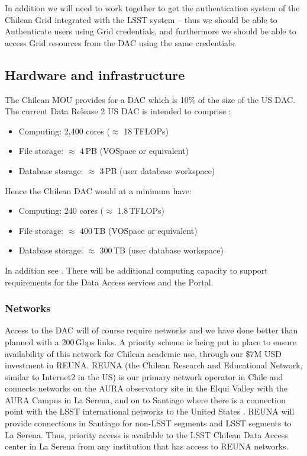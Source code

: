 In addition we will need to work together to get the authentication system of the Chilean Grid integrated with the LSST system  -- thus we should be able to Authenticate users using Grid credentials, and furthermore we should be able to access Grid resources from the DAC using the same credentials.


\subsection{Hardware and infrastructure}\label{sec:hw}

The Chilean MOU provides for a DAC which is 10\% of the size of the US DAC.
The current Data Release 2 US DAC is intended to comprise :
\begin{itemize}
\item Computing: 2,400 cores ($\approx$ 18\,TFLOPs)
\item File storage: $\approx$ 4\,PB  (VOSpace or equivalent)
\item Database storage: $\approx$ 3\,PB (user database workspace)

\end{itemize}

Hence the Chilean DAC would at a minimum have:
\begin{itemize}
\item Computing: 240 cores ($\approx$ 1.8\,TFLOPs)
\item File storage: $\approx$ 400\,TB  (VOSpace or equivalent)
\item Database storage: $\approx$ 300\,TB (user database workspace)

\end{itemize}

In addition see .
There will be additional computing capacity to support requirements for the Data Access services and the Portal.


\subsubsection{Networks}

Access to the DAC will of course require networks and we have done better than planned with a 200\,Gbps links.
A priority scheme is being put in place to ensure availability of this network  for Chilean academic use, through our \$7M USD investment in REUNA.
REUNA (the Chilean Research and Educational Network, similar to Internet2 in the US) is our primary network operator in Chile and connects networks on the AURA observatory site in the Elqui Valley with the AURA Campus in La Serena, and on to Santiago where there is a connection point with the LSST international networks to the United States .
REUNA will provide connections in Santiago for non-LSST segments and LSST segments to La Serena.
Thus, priority access is available to the LSST Chilean Data Access center in La Serena from any institution that has access to REUNA networks.

